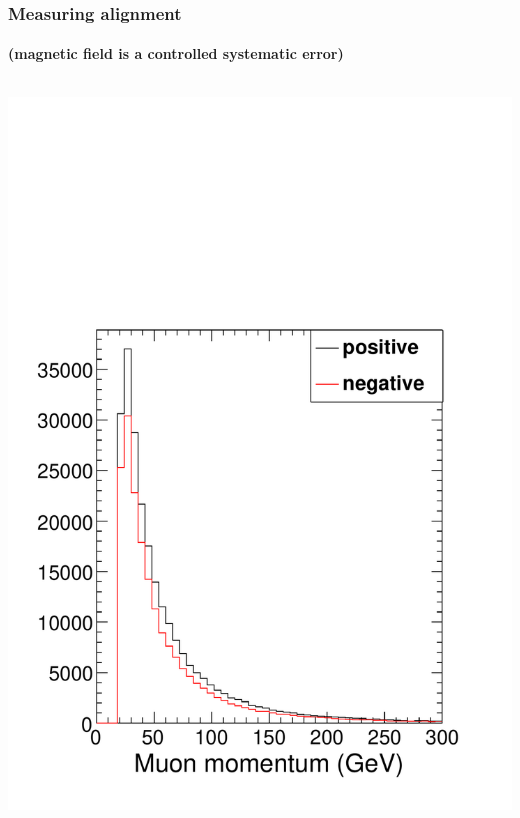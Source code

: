 \documentclass[compress]{beamer}
\begin{document}
\begin{frame}
\frametitle{Measuring alignment}
\framesubtitle{(magnetic field is a controlled systematic error)}

\begin{columns}
\includegraphics[width=\linewidth]{demo_momentum.pdf}


\end{columns}
\end{frame}
\end{document}
